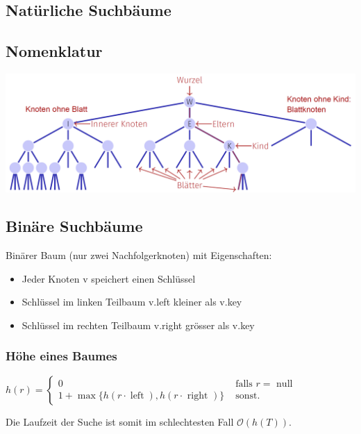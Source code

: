 \vspace{-4pt}
\begin{sectionbox}
\section{Natürliche Suchbäume}
\subsection{Nomenklatur}
\begin{center}
    \includegraphics[width = \columnwidth]{../img/BaumNomen.png}
\end{center}
\end{sectionbox}
\vspace{-4pt}
\begin{sectionbox}
  \subsection{Binäre Suchbäume}\smallskip
  Binärer Baum (nur zwei Nachfolgerknoten) mit Eigenschaften:\par
  \begin{itemize}
      \item Jeder Knoten v speichert einen Schlüssel
      \item Schlüssel im linken Teilbaum v.left kleiner als v.key
      \item Schlüssel im rechten Teilbaum v.right grösser als v.key
  \end{itemize}\vspace{7px}
  
  \subsubsection{Höhe eines Baumes}\smallskip
  $h(r)=\left\{\begin{array}{ll}0 & \text { falls } r=\text { null } \\ 1+\max \{h(r \cdot \operatorname{left}), h(r \cdot \text { right })\} & \text { sonst. }\end{array}\right.$\par\smallskip
  Die Laufzeit der Suche ist somit im schlechtesten Fall $\mathcal{O}(h(T))$.\par\smallskip
  \end{sectionbox}
